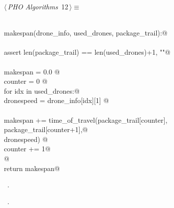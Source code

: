 \documentclass[12.0pt]{report}
\begin{document}
\begin{flushleft} \small
\begin{minipage}{\linewidth}\label{scrap7}\raggedright\small
{} $\langle\,${\itshape PHO Algorithms}\nobreak\ {\footnotesize {12}}$\,\rangle\equiv$
\vspace{-1ex}
\begin{list}{}{} \item
\mbox{}\verb@@\\
\mbox{}\verb@def makespan(drone_info, used_drones, package_trail):@\\
\mbox{}\verb@@\\
\mbox{}\verb@    assert len(package_trail) == len(used_drones)+1, ""@\\
\mbox{}\verb@@\\
\mbox{}\verb@    makespan = 0.0   @\\
\mbox{}\verb@    counter  = 0    @\\
\mbox{}\verb@    for idx in used_drones:@\\
\mbox{}\verb@         dronespeed    = drone_info[idx][1]          @\\
\mbox{}\verb@@\\
\mbox{}\verb@         makespan += time_of_travel(package_trail[counter],\@\\
\mbox{}\verb@                                    package_trail[counter+1],@\\
\mbox{}\verb@                                    dronespeed) @\\
\mbox{}\verb@         counter += 1@\\
\mbox{}\verb@    @\\
\mbox{}\verb@    return makespan@\\
\mbox{}\verb@@{\NWsep}
\end{list}
\vspace{-1.5ex}
\footnotesize
\begin{list}{}{\setlength{\itemsep}{-\parsep}\setlength{\itemindent}{-\leftmargin}}
\item \NWtxtMacroDefBy\ .
\item \NWtxtMacroRefIn\ .

\item{}
\end{list}
\end{minipage}\vspace{4ex}
\end{flushleft}
  
\end{document}
